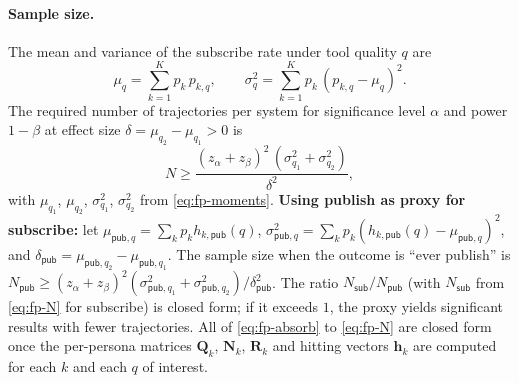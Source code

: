 \paragraph{Sample size.}
The mean and variance of the subscribe rate under tool quality $q$ are
\begin{equation}
  \mu_q = \sum_{k=1}^K p_k\, p_{k,q}, \qquad \sigma_q^2 = \sum_{k=1}^K p_k\, (p_{k,q} - \mu_q)^2. \label{eq:fp-moments}
\end{equation}
The required number of trajectories per system for significance level $\alpha$ and power $1-\beta$ at effect size $\delta = \mu_{q_2} - \mu_{q_1} > 0$ is
\begin{equation}
  N \geq \frac{(z_{\alpha} + z_{\beta})^2\, (\sigma_{q_1}^2 + \sigma_{q_2}^2)}{\delta^2}, \label{eq:fp-N}
\end{equation}
with $\mu_{q_1}$, $\mu_{q_2}$, $\sigma_{q_1}^2$, $\sigma_{q_2}^2$ from \eqref{eq:fp-moments}. \textbf{Using publish as proxy for subscribe:} let $\mu_{\mathsf{pub},q} = \sum_k p_k h_{k,\mathsf{pub}}(q)$, $\sigma_{\mathsf{pub},q}^2 = \sum_k p_k (h_{k,\mathsf{pub}}(q) - \mu_{\mathsf{pub},q})^2$, and $\delta_{\mathsf{pub}} = \mu_{\mathsf{pub},q_2} - \mu_{\mathsf{pub},q_1}$. The sample size when the outcome is ``ever publish'' is $N_{\mathsf{pub}} \geq (z_{\alpha} + z_{\beta})^2 (\sigma_{\mathsf{pub},q_1}^2 + \sigma_{\mathsf{pub},q_2}^2) / \delta_{\mathsf{pub}}^2$. The ratio $N_{\mathsf{sub}}/N_{\mathsf{pub}}$ (with $N_{\mathsf{sub}}$ from \eqref{eq:fp-N} for subscribe) is closed form; if it exceeds $1$, the proxy yields significant results with fewer trajectories. All of \eqref{eq:fp-absorb} to \eqref{eq:fp-N} are closed form once the per-persona matrices $\mathbf{Q}_k$, $\mathbf{N}_k$, $\mathbf{R}_k$ and hitting vectors $\mathbf{h}_k$ are computed for each $k$ and each $q$ of interest.

